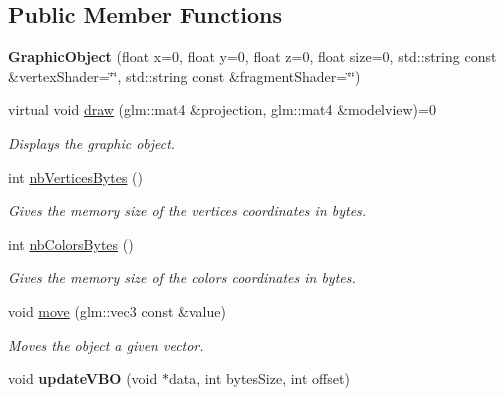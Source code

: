 \subsection*{Public Member Functions}
\begin{DoxyCompactItemize}
\item 
\hypertarget{classGraphicObject_a71f73b9dbb85a3a27d98aae1922120f4}{}{\bfseries Graphic\+Object} (float x=0, float y=0, float z=0, float size=0, std\+::string const \&vertex\+Shader=\char`\"{}\char`\"{}, std\+::string const \&fragment\+Shader=\char`\"{}\char`\"{})\label{classGraphicObject_a71f73b9dbb85a3a27d98aae1922120f4}

\item 
virtual void \hyperlink{classGraphicObject_aacdc39f9e0b36ebb5c815e8bba717d7e}{draw} (glm\+::mat4 \&projection, glm\+::mat4 \&modelview)=0
\begin{DoxyCompactList}\small\item\em Displays the graphic object. \end{DoxyCompactList}\item 
int \hyperlink{classGraphicObject_a8e43dbd70ae6a48bc53cf1b509791af0}{nb\+Vertices\+Bytes} ()
\begin{DoxyCompactList}\small\item\em Gives the memory size of the vertices coordinates in bytes. \end{DoxyCompactList}\item 
int \hyperlink{classGraphicObject_a9f4d774f94d51ebf0c44829898dbe012}{nb\+Colors\+Bytes} ()
\begin{DoxyCompactList}\small\item\em Gives the memory size of the colors coordinates in bytes. \end{DoxyCompactList}\item 
void \hyperlink{classGraphicObject_a797f54b07ba4ee40b496a011245d9d8c}{move} (glm\+::vec3 const \&value)
\begin{DoxyCompactList}\small\item\em Moves the object a given vector. \end{DoxyCompactList}\item 
\hypertarget{classGraphicObject_ab4fe774c59ee6d67547094f2410b7266}{}void {\bfseries update\+V\+B\+O} (void $\ast$data, int bytes\+Size, int offset)\label{classGraphicObject_ab4fe774c59ee6d67547094f2410b7266}

\end{DoxyCompactItemize}
